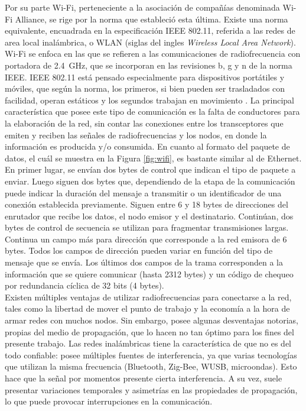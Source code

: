 Por su parte Wi-Fi, perteneciente a la asociación de compañías denominada Wi-Fi Alliance, se rige por la norma que estableció esta última. Existe una norma equivalente, encuadrada en la especificación IEEE 802.11, referida a las redes de area local inalámbrica, o WLAN (siglas del ingles {\it Wireless Local Area Network}). Wi-Fi se enfoca en las que se refieren a las comunicaciones de radiofrecuencia con portadora de \SI{2,4}{\giga\hertz}, que se incorporan en las revisiones b, g y n de la norma IEEE. IEEE 802.11 está pensado especialmente para dispositivos portátiles y móviles, que según la norma, los primeros, si bien pueden ser trasladados con facilidad, operan estáticos y los segundos trabajan en movimiento \cite{wifi2016}. La principal característica que posee este tipo de comunicación es la falta de conductores para la elaboración de la red, sin contar las conexiones entre los transceptores que emiten y reciben las señales de radiofrecuencias y los nodos, en donde la información es producida y/o consumida. En cuanto al formato del paquete de datos, el cuál se muestra en la Figura \ref{fig:wifi}, es bastante similar al de Ethernet. En primer lugar, se envían dos bytes de control que indican el tipo de paquete a enviar. Luego siguen dos bytes que, dependiendo de la etapa de la comunicación puede indicar la duración del mensaje a transmitir o un identificador de una conexión establecida previamente. Siguen entre 6 y 18 bytes de direcciones del enrutador que recibe los datos, el nodo emisor y el destinatario. Continúan, dos bytes de control de secuencia se utilizan para fragmentar transmisiones largas. Continua un campo más para dirección que corresponde a la red emisora de 6 bytes. Todos los campos de dirección pueden variar en función del tipo de mensaje que se envía. Los últimos dos campos de la trama corresponden a la información que se quiere comunicar (hasta 2312 bytes) y un código de chequeo por redundancia cíclica de 32 bits (4 bytes).\\

Existen múltiples ventajas de utilizar radiofrecuencias para conectarse a la red, tales como la libertad de mover el punto de trabajo y la economía a la hora de armar redes con muchos nodos. Sin embargo, posee algunas desventajas notorias, propias del medio de propagación, que lo hacen no tan óptimo para los fines del presente trabajo. Las redes inalámbricas tiene la característica de que no es del todo confiable: posee múltiples fuentes de interferencia, ya que varias tecnologías que utilizan la misma frecuencia (Bluetooth, Zig-Bee, WUSB, microondas). Esto hace que la señal por momentos presente cierta interferencia. A su vez, suele presentar variaciones temporales y asimetrías en las propiedades de propagación, lo que puede provocar interrupciones en la comunicación.\\

